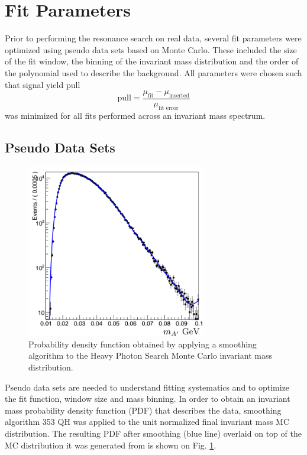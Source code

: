 \section{Fit Parameters}

Prior to performing the resonance search on real data, several fit parameters 
were optimized using pseudo data sets based on Monte Carlo.  These included the size of the fit 
window, the binning of the invariant mass distribution and the order of 
the polynomial used to describe the background.  All parameters were chosen 
such that signal yield pull
\begin{equation}
    \text{pull} = \frac{\mu_{\text{fit}} - \mu_{\text{inserted}}}{\mu_{\text{fit error}}}
\end{equation}
was minimized for all fits performed across an invariant mass spectrum.

\subsection{Pseudo Data Sets}

\begin{figure}[ht]
    \centering
    \includegraphics[width=0.7\textwidth]{images/smooth_pdf.png}
    \caption{Probability density function obtained by applying a smoothing algorithm 
             to the Heavy Photon Search Monte Carlo invariant mass distribution.}
    \label{fig:smooth_pdf}
\end{figure}

Pseudo data sets are needed to understand fitting systematics and to optimize
the fit function, window size and mass binning.  In order to obtain an invariant
mass probability
density function (PDF) that describes the data, smoothing algorithm 353 QH 
\cite{Friedman:1974vj} was
applied to the unit normalized final invariant mass MC distribution.  The resulting
PDF after smoothing (blue line) overlaid on top of the MC distribution it was generated 
from is shown on Fig. \ref{fig:smooth_pdf}.  


